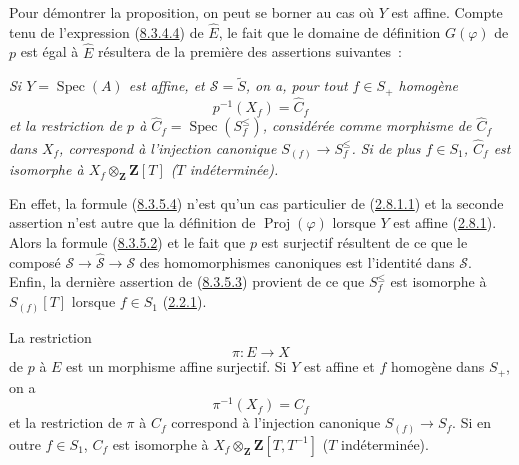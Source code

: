 Pour démontrer la proposition, on peut se borner au cas où $Y$ est affine.
Compte tenu de l'expression (\hyperref[II.8.3.4.4-fr]{8.3.4.4}) de
$\widehat{E}$, le fait que le domaine de définition $G(\varphi)$ de $p$ est
égal à $\widehat{E}$ résultera de la première des assertions suivantes~:

\begin{env}[8.3.5.3]
\label{II.8.3.5.3-fr}
\itshape Si $Y=\operatorname{Spec}(A)$ est affine, et $\mathcal{S}=\widetilde{S}$, on
a, pour tout $f\in S_+$ homogène
\begin{equation}
\label{II.8.3.5.4-fr}
  p^{-1}(X_f)=\widehat{C}_f
\tag{8.3.5.4}
\end{equation}
et la restriction de $p$ à
$\widehat{C}_f=\operatorname{Spec}(S_f^{\leq})$, considérée comme morphisme de
$\widehat{C}_f$ dans $X_f$, correspond à l'injection canonique
$S_{(f)}\to S_f^{\leq}$. Si de plus $f\in S_1$, $\widehat{C}_f$ est isomorphe
à $X_f\otimes_{\mathbf{Z}}\mathbf{Z}[T]$ ($T$ indéterminée).
\end{env}

En effet, la formule (\hyperref[II.8.3.5.4-fr]{8.3.5.4}) n'est qu'un cas
particulier de (\hyperref[II.2.8.1.1-fr]{2.8.1.1}) et la seconde assertion
n'est autre que la définition de $\operatorname{Proj}(\varphi)$ lorsque $Y$
est affine (\hyperref[II.2.8.1-fr]{2.8.1}). Alors la formule
(\hyperref[II.8.3.5.2-fr]{8.3.5.2}) et le fait que $p$ est surjectif résultent
de ce que le composé $\mathcal{S}\to\widehat{\mathcal{S}}\to\mathcal{S}$ des
homomorphismes canoniques est l'identité dans $\mathcal{S}$. Enfin, la
dernière assertion de (\hyperref[II.8.3.5.3-fr]{8.3.5.3}) provient de ce que
$S_f^{\leq}$ est isomorphe à $S_{(f)}[T]$ lorsque $f\in S_1$
(\hyperref[II.2.2.1-fr]{2.2.1}).

\begin{corollary}[8.3.6]
\label{II.8.3.6-fr}
La restriction
\begin{equation}
\label{II.8.3.6.1-fr}
  \pi:E\to X
\tag{8.3.6.1}
\end{equation}
de $p$ à $E$ est un morphisme affine surjectif. Si $Y$ est affine et $f$
homogène dans $S_+$, on a
\begin{equation}
\label{II.8.3.6.2-fr}
  \pi^{-1}(X_f)=C_f
\tag{8.3.6.2}
\end{equation}
et la restriction de $\pi$ à $C_f$ correspond à l'injection canonique
$S_{(f)}\to S_f$. Si en outre $f\in S_1$, $C_f$ est isomorphe à
$X_f\otimes_{\mathbf{Z}}\mathbf{Z}[T,T^{-1}]$ ($T$ indéterminée).
\end{corollary}

